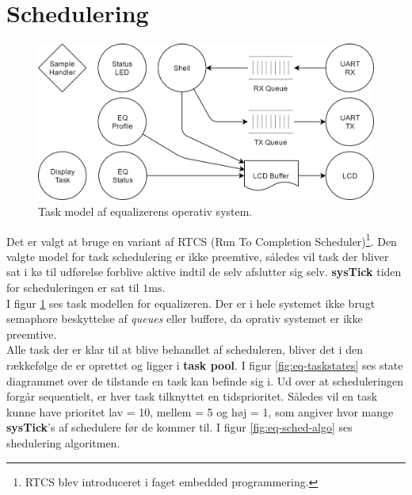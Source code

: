 \section{Schedulering}

\begin{figure}[h!]
	\centering
	\includegraphics[width=.7\textwidth]{billeder/eq-one.png}
	\caption{Task model af equalizerens operativ system.}
	\label{fig:eq-taskmodel}
\end{figure}

Det er valgt at bruge en variant af RTCS (Run To Completion Scheduler)\footnote{RTCS blev introduceret i faget embedded programmering.}. 
Den valgte model for task schedulering er ikke preemtive, således vil task der bliver sat i kø til udførelse forblive aktive indtil de selv afslutter sig selv.
\textbf{sysTick} tiden for scheduleringen er sat til $1\si{\milli\second}$.\\

I figur \ref{fig:eq-taskmodel} ses task modellen for equalizeren. 
Der er i hele systemet ikke brugt semaphore beskyttelse af \textit{queues} eller buffere, da oprativ systemet er ikke preemtive. \\

Alle task der er klar til at blive behandlet af scheduleren, bliver det i den rækkefølge de er oprettet og ligger i \textbf{task pool}. 
I figur \ref{fig:eq-taskstates} ses state diagrammet over de tilstande en task kan befinde sig i.
Ud over at scheduleringen forgår sequentielt, er hver task tilknyttet en tidsprioritet. 
Således vil en task kunne have prioritet lav = 10, mellem = 5 og høj = 1, som angiver hvor mange \textbf{sysTick}'s af schedulere før de kommer til.
I figur \ref{fig:eq-sched-algo} ses shedulering algoritmen.

